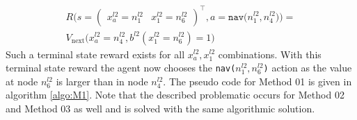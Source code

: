 \begin{multline}\label{eq:R_t_next}
    R\big( s=\begin{pmatrix} x_a^{l2}=n_1^{l2} & x_1^{l2}=n_6^{l2} \end{pmatrix}^\intercal, a=\texttt{nav($n_1^{l2}, n_4^{l2}$)} \big) = \\
    V_\text{next}\big( x_a^{l2}=n_4^{l2}, b^{l2}(x_1^{l2}=n_6^{l2})=1 \big)
\end{multline}
Such a terminal state reward exists for all $x_a^{l2}, x_1^{l2}$ combinations. With this terminal state reward the agent now chooses the \texttt{nav($n_1^{l2}, n_6^{l2}$)} action as the value at node $n_6^{l2}$ is larger than in node $n_4^{l2}$. The pseudo code for Method 01 is given in algorithm \ref{algo:M1}. Note that the described problematic occurs for Method 02 and Method 03 as well and is solved with the same algorithmic solution. 
